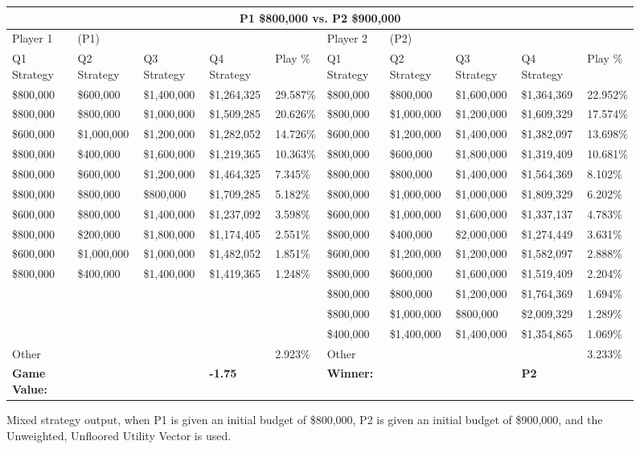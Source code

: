 \documentclass[11pt]{article}
\begin{document}
\begin{figure}
\tiny
\begin{tabular}{ |p{1.0cm}p{1.0cm}p{1.0cm}p{2.0cm}|p{1.0cm}||p{1.0cm}p{1.0cm}p{1.0cm}p{2.0cm}|p{1.0cm}|}
\hline
\multicolumn{10}{|c|}{P1 \$800,000 vs. P2 \$900,000} \\
\hline
Player 1 & (P1) & & & & Player 2 & (P2) & & & \\
\hline
Q1 Strategy & Q2 Strategy & Q3 Strategy & Q4 Strategy  &  Play \% & Q1 Strategy & Q2 Strategy & Q3 Strategy & Q4 Strategy  &  Play \%\\
\hline
\$800,000 & \$600,000 & \$1,400,000 & \$1,264,325 & 29.587\% & \$800,000 & \$800,000 & \$1,600,000 & \$1,364,369 & 22.952\% \\
\$800,000 & \$800,000 & \$1,000,000 & \$1,509,285 & 20.626\% & \$800,000 & \$1,000,000 & \$1,200,000 & \$1,609,329 & 17.574\% \\
\$600,000 & \$1,000,000 & \$1,200,000 & \$1,282,052 & 14.726\% & \$600,000 & \$1,200,000 & \$1,400,000 & \$1,382,097 & 13.698\% \\
\$800,000 & \$400,000 & \$1,600,000 & \$1,219,365 & 10.363\% & \$800,000 & \$600,000 & \$1,800,000 & \$1,319,409 & 10.681\% \\
\$800,000 & \$600,000 & \$1,200,000 & \$1,464,325 & 7.345\% & \$800,000 & \$800,000 & \$1,400,000 & \$1,564,369 & 8.102\% \\
\$800,000 & \$800,000 & \$800,000 & \$1,709,285 & 5.182\% & \$800,000 & \$1,000,000 & \$1,000,000 & \$1,809,329 & 6.202\% \\
\$600,000 & \$800,000 & \$1,400,000 & \$1,237,092 & 3.598\% & \$600,000 & \$1,000,000 & \$1,600,000 & \$1,337,137 & 4.783\% \\
\$800,000 & \$200,000 & \$1,800,000 & \$1,174,405 & 2.551\% & \$800,000 & \$400,000 & \$2,000,000 & \$1,274,449 & 3.631\% \\
\$600,000 & \$1,000,000 & \$1,000,000 & \$1,482,052 & 1.851\% & \$600,000 & \$1,200,000 & \$1,200,000 & \$1,582,097 & 2.888\% \\
\$800,000 & \$400,000 & \$1,400,000 & \$1,419,365 & 1.248\% & \$800,000 & \$600,000 & \$1,600,000 & \$1,519,409 & 2.204\% \\
& & & & & \$800,000 & \$800,000 & \$1,200,000 & \$1,764,369 & 1.694\% \\
& & & & & \$800,000 & \$1,000,000 & \$800,000 & \$2,009,329 & 1.289\% \\
& & & & & \$400,000 & \$1,400,000 & \$1,400,000 & \$1,354,865 & 1.069\% \\
\hline
Other& & & & 2.923\% & Other& & & & 3.233\% \\
\hline
\small \textbf{Game Value:} &&& \small \textbf{-1.75} && \small \textbf{Winner:} &&& \small \textbf{P2}&\\
\hline
\end{tabular}
\caption{Mixed strategy output, when P1 is given an initial budget of \$800,000, P2 is given an initial budget of \$900,000, and the Unweighted, Unfloored Utility Vector is used.}
\label{8v9table.4}
\end{figure}
\end{document}
